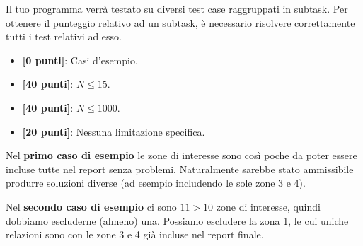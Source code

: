 \Scoring
Il tuo programma verrà testato su diversi test case raggruppati in subtask.
Per ottenere il punteggio relativo ad un subtask, è necessario risolvere
correttamente tutti i test relativi ad esso.
\begin{itemize}[nolistsep,itemsep=2mm]
\item \textbf{ [\phantom{0}0 punti]}: Casi d'esempio.
\item \textbf{ [40 punti]}: $N \le 15$.
\item \textbf{ [40 punti]}: $N \le 1000$.
\item \textbf{ [20 punti]}: Nessuna limitazione specifica.
\end{itemize}

\Examples
\begin{example}
%
%
\end{example}

\Explanation

Nel \textbf{primo caso di esempio} le zone di interesse sono così poche da poter essere incluse tutte nel report senza problemi. Naturalmente sarebbe stato ammissibile produrre soluzioni diverse (ad esempio includendo le sole zone 3 e 4).


Nel \textbf{secondo caso di esempio} ci sono $11 > 10$ zone di interesse, quindi dobbiamo escluderne (almeno) una. Possiamo escludere la zona 1, le cui uniche relazioni sono con le zone 3 e 4 già incluse nel report finale.

